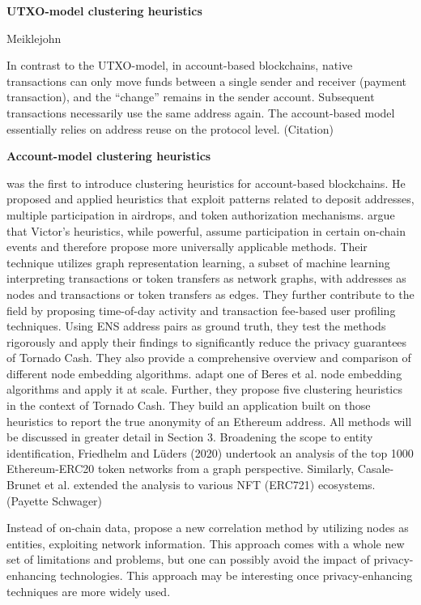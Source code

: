 \documentclass[12pt,a4paper,titlepage,oneside,english]{article}
\begin{document}

\textbf{UTXO-model clustering heuristics} %

Meiklejohn

In contrast to the UTXO-model, in account-based blockchains, native transactions can only move funds between a single sender and receiver (payment transaction), and the “change” remains in the sender account. Subsequent transactions necessarily use the same address again. The account-based model essentially relies on address reuse on the protocol level. (Citation)

\textbf{Account-model clustering heuristics}

\cite{FV:17} was the first to introduce clustering heuristics for account-based blockchains. He proposed and applied heuristics that exploit patterns related to deposit addresses, multiple participation in airdrops, and token authorization mechanisms. \newline
\cite{Beres2020} argue that Victor’s heuristics, while powerful, assume participation in certain on-chain events and therefore propose more universally applicable methods. Their technique utilizes graph representation learning, a subset of machine learning interpreting transactions or token transfers as network graphs, with addresses as nodes and transactions or token transfers as edges. They further contribute to the field by proposing time-of-day activity and transaction fee-based user profiling techniques. Using ENS address pairs as ground truth, they test the methods rigorously and apply their findings to significantly reduce the privacy guarantees of Tornado Cash. They also provide a comprehensive overview and comparison of different node embedding algorithms. \newline
\cite{wu2022tutela} adapt one of Beres et al. node embedding algorithms and apply it at scale. Further, they propose five clustering heuristics in the context of Tornado Cash. They build an application built on those heuristics to report the true anonymity of an Ethereum address. All methods will be discussed in greater detail in Section 3.
Broadening the scope to entity identification, Friedhelm and Lüders (2020) undertook an analysis of the top 1000 Ethereum-ERC20 token networks from a graph perspective. Similarly, Casale-Brunet et al. extended the analysis to various NFT (ERC721) ecosystems. (Payette Schwager)

Instead of on-chain data, \cite{yu2023} propose a new correlation method by utilizing nodes as entities, exploiting network information. This approach comes with a whole new set of limitations and problems, but one can possibly avoid the impact of privacy-enhancing technologies. This approach may be interesting once privacy-enhancing techniques are more widely used.
\end{document}
